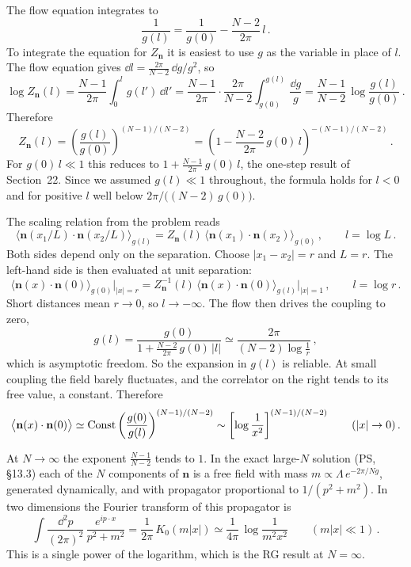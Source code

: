  The flow equation integrates to
\[
\frac1{g(l)}=\frac1{g(0)}-\frac{N-2}{2\pi}\,l\,.
\]
To integrate the equation for $Z_{\mathbf n}$ it is easiest to use $g$ as the
variable in place of $l$. The flow equation gives
$\dd l=\frac{2\pi}{N-2}\,\dd g/g^2$, so
\[
\log Z_{\mathbf n}(l)=\frac{N-1}{2\pi}\int_0^lg(l')\,\dd l'
=\frac{N-1}{2\pi}\cdot\frac{2\pi}{N-2}\int_{g(0)}^{g(l)}\frac{\dd g}g
=\frac{N-1}{N-2}\,\log\frac{g(l)}{g(0)}\,.
\]
Therefore
\[
Z_{\mathbf n}(l)=\left(\frac{g(l)}{g(0)}\right)^{(N-1)/(N-2)}=\left(1-\frac{N-2}{2\pi}\,g(0)\,l\right)^{-(N-1)/(N-2)}\,.
\]
For $g(0)\,l\ll1$ this reduces to $1+\frac{N-1}{2\pi}\,g(0)\,l$, the
one-step result of Section~22. Since we assumed $g(l)\ll1$ throughout, the
formula holds for $l<0$ and for positive $l$ well below $2\pi/\bigl((N-2)\,g(0)\bigr)$.

 The scaling relation from the problem reads
\[
\bigl\langle\mathbf n(x_1/L)\cdot\mathbf n(x_2/L)\bigr\rangle_{g(l)}=Z_{\mathbf n}(l)\,\bigl\langle\mathbf n(x_1)\cdot\mathbf n(x_2)\bigr\rangle_{g(0)}\,,\qquad l=\log L\,.
\]
Both sides depend only on the separation. Choose $|x_1-x_2|=r$ and $L=r$. The
left-hand side is then evaluated at unit separation:
\[
\bigl\langle\mathbf n(x)\cdot\mathbf n(0)\bigr\rangle_{g(0)}\Big|_{|x|=r}
=Z_{\mathbf n}^{-1}(l)\,\bigl\langle\mathbf n(x)\cdot\mathbf n(0)\bigr\rangle_{g(l)}\Big|_{|x|=1}\,,\qquad l=\log r\,.
\]
Short distances mean $r\to0$, so $l\to-\infty$. The flow then drives the
coupling to zero,
\[
g(l)=\frac{g(0)}{1+\frac{N-2}{2\pi}\,g(0)\,|l|}\simeq\frac{2\pi}{(N-2)\log\frac1r}\,,
\]
which is asymptotic freedom. So the expansion in $g(l)$ is reliable. At small
coupling the field barely fluctuates, and the correlator on the right tends to
its free value, a constant. Therefore
\[
\bigl\langle\mathbf n(x)\cdot\mathbf n(0)\bigr\rangle\simeq\text{Const}\left(\frac{g(0)}{g(l)}\right)^{(N-1)/(N-2)}
\sim\left[\log\frac1{x^2}\right]^{(N-1)/(N-2)}\qquad(|x|\to0)\,.
\]

 At $N\to\infty$ the exponent $\frac{N-1}{N-2}$ tends to $1$. In
the exact large-$N$ solution (PS, \S13.3) each of the $N$ components of
$\mathbf n$ is a free field with mass $m\propto\Lambda\,e^{-2\pi/Ng}$, generated
dynamically, and with propagator proportional to $1/(p^2+m^2)$. In two
dimensions the Fourier transform of this propagator is
\[
\int\frac{\dd^2p}{(2\pi)^2}\,\frac{e^{ip\cdot x}}{p^2+m^2}=\frac1{2\pi}\,K_0(m|x|)\simeq\frac1{4\pi}\,\log\frac1{m^2x^2}\qquad(m|x|\ll1)\,.
\]
This is a single power of the logarithm, which is the RG result at $N=\infty$.

